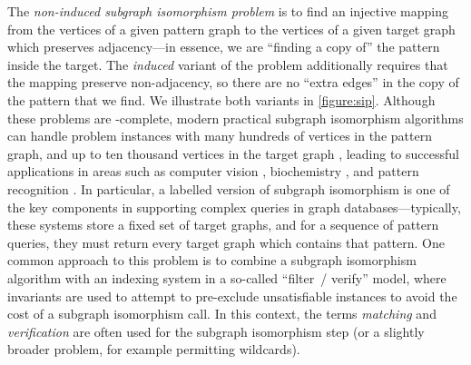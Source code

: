 \documentclass[twoside,11pt]{article}
\newcommand{\citep}[1]{\cite{#1}}
\begin{document}
The \emph{non-induced subgraph isomorphism problem} is to find an injective mapping from the
vertices of a given pattern graph to the vertices of a given target graph which preserves
adjacency---in essence, we are ``finding a copy of'' the pattern inside the target. The
\emph{induced} variant of the problem additionally requires that the mapping preserve non-adjacency,
so there are no ``extra edges'' in the copy of the pattern that we find. We illustrate both variants
in \cref{figure:sip}.  Although these problems are \NP-complete, modern practical subgraph
isomorphism algorithms can handle problem instances with many hundreds of vertices in the pattern
graph, and up to ten thousand vertices in the target graph
\citep{DBLP:journals/pami/CordellaFSV04,DBLP:journals/ai/Solnon10,DBLP:conf/cp/AudemardLMGP14,DBLP:conf/cp/McCreeshP15,DBLP:conf/lion/KotthoffMS16},
leading to successful applications in areas such as computer vision
\citep{DBLP:journals/cviu/DamiandSHJS11,DBLP:journals/pr/SolnonDHJ15}, biochemistry
\citep{o:10.1371/journal.pone.0076911,DBLP:conf/gbrpr/CarlettiFV15}, and pattern recognition
\citep{DBLP:journals/ijprai/ConteFSV04}.  In particular, a labelled version of subgraph isomorphism
is one of the key components in supporting complex queries in graph databases---typically, these
systems store a fixed set of target graphs, and for a sequence of pattern queries, they must return
every target graph which contains that pattern.  One common approach to this problem is to combine a
subgraph isomorphism algorithm with an indexing system in a so-called ``filter~/ verify'' model,
where invariants are used to attempt to pre-exclude unsatisfiable instances to avoid the cost of a
subgraph isomorphism call. In this context, the terms \emph{matching} and \emph{verification} are
often used for the subgraph isomorphism step (or a slightly broader problem, for example permitting
wildcards).
\end{document}
